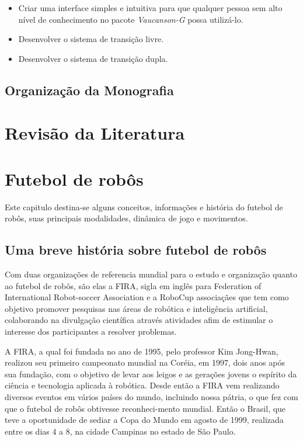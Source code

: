 \documentclass[a4paper,12pt,portuguese]{ufms-cpcx}
\begin{document}
\begin{itemize}
	
	\item Criar uma interface simples e intuitiva para que qualquer pessoa sem alto nível de conhecimento no pacote \textit{Vaucanson-G} possa utilizá-lo.
	
	\item Desenvolver o sistema de transição livre.
	
	\item Desenvolver o sistema de transição dupla.
	
	
\end{itemize}

\section {Organização da Monografia}

\chapter{Revisão da Literatura}

\chapter{Futebol de robôs}
Este capitulo destina-se alguns conceitos, informações e história do futebol de robôs, suas principais modalidades, dinâmica de jogo e movimentos.

\section{Uma breve história sobre futebol de robôs}
Com duas organizações de referencia mundial para o estudo e organização quanto ao futebol de robôs, são elas a FIRA, sigla em inglês para Federation of International Robot-soccer Association e a RoboCup associaçães que tem como objetivo promover pesquisas nas áreas de robótica e inteligência artificial, colaborando na divulgação científica através atividades afim de estimular o interesse dos participantes a resolver problemas. 

A FIRA, a qual foi fundada no ano de 1995, pelo professor Kim Jong-Hwan, realizou seu primeiro campeonato mundial na Coréia, em 1997, dois anos após sua fundação, com o objetivo de levar aos leigos e as gerações jovens o espírito da ciência e tecnologia aplicada à robótica. Desde então a FIRA vem realizando diversos eventos em vários
países do mundo, incluindo nossa pátria, o que fez com que o futebol de robôs obtivesse reconheci-mento mundial. Então o Brasil, que teve a oportunidade de sediar a Copa do Mundo em agosto de 1999, realizada entre os dias 4 a 8, na cidade Campinas no estado de São Paulo.
\end{document}
